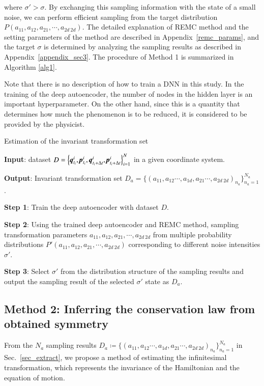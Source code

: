 \documentclass[preprint,
bibnotes,
 amsmath,amssymb,
 aps,
]{revtex4-1}
\newcounter{num}
\begin{document}
where $\sigma' > \sigma$. By exchanging this sampling information with the state of a small noise, we can perform efficient sampling from the target distribution $P(a_{11},a_{12},a_{21},\cdots,a_{2d\:2d})$. 
The detailed explanation of REMC method and the setting parameters of the method are described in Appendix~\ref{remc_params}, and the target $\sigma$ is determined by analyzing the sampling results as described in Appendix~\ref{appendix_sec3}. 
The procedure of Method 1 is summarized in Algorithm \ref{alg1}.\par
Note that there is no description of how to train a DNN in this study. 
In the training of the deep autoencoder, the number of nodes in the hidden layer is an important hyperparameter. 
On the other hand, since this is a quantity that determines how much the phenomenon is to be reduced, it is considered to be provided by the physicist. 


\begin{algorithm}[H]  
\caption{Estimation of the invariant transformation set}         
\label{alg1}                          
\begin{algorithmic}
\item[{\bf Input}:] dataset $D = \left\{\textit{\textbf{q}}_{t_i}^i, \textit{\textbf{p}}_{t_i}^i,\textit{\textbf{q}}_{t_i+\Delta t}^i, \textit{\textbf{p}}_{t_i+\Delta t}^i\right\}_{i=1}^N$ in a given coordinate system.
\item[{\bf Output}:] Invariant transformation set $D_{a} = \{(a_{11},a_{12}\cdots ,a_{1d},a_{21} \cdots ,a_{2d\:2d})_{n_a}\}_{n_{a}=1}^{N_a}$. 
\item[{\bf Step 1}:] Train the deep autoencoder with dataset $D$. 
\item[{\bf Step 2}:] Using the trained deep autoencoder and REMC method, sampling transformation parameters $a_{11},a_{12},a_{21},\cdots,a_{2d\:2d}$ from multiple probability distributions $P'(a_{11},a_{12},a_{21},\cdots,a_{2d\:2d})$ corresponding to different noise intensities $\sigma'$. 
\item[{\bf Step 3}:] Select $\sigma'$ from the distribution structure of the sampling results and output the sampling result of the selected $\sigma'$ state as $D_a$. 
\end{algorithmic}
\end{algorithm}

\subsection{Method 2: Inferring the conservation law from obtained symmetry}
\label{sec_consest}
From the $N_a$ sampling results $D_{a} \coloneqq \{(a_{11},a_{12}\cdots ,a_{1d},a_{21} \cdots ,a_{2d\:2d})_{n_a}\}_{n_{a}=1}^{N_a}$ in  Sec.~\ref{sec_extract}, we propose a method of estimating the infinitesimal transformation, which represents the invariance of the Hamiltonian and the equation of motion. \\
\end{document}
